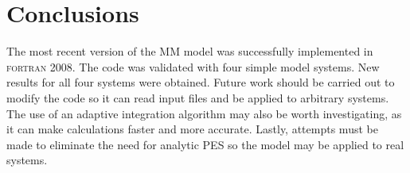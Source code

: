 \section*{Conclusions}
%
The most recent version of the MM model was successfully implemented in \textsc{fortran 2008}. The code was validated with four simple model systems. New results for all four systems were obtained.
Future work should be carried out to modify the code so it can read input files and be applied to arbitrary systems. The use of an adaptive integration algorithm may also be worth investigating, as it can make calculations faster and more accurate. Lastly, attempts must be made to eliminate the need for analytic PES so the model may be applied to real systems.
%
\setcounter{figure}{0}
\begin{comment}
\clearpage
\newpage
\pagenumbering{arabic}              %
\setcounter{page}{1}                %
\thispagestyle{empty}               %
\end{comment}